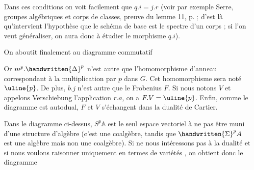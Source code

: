 
Dans ces conditions on voit facilement que $q.i=j.r$ (voir par exemple Serre, groupes algébriques et corps de classes, preuve du lemme 11, p. ; d'est là qu'intervient l'hypothèse que le schéma de base est le spectre d'un corps ; si l'on veut généraliser, on aura donc à étudier le morphisme $q.i$).

On aboutit finalement au diagramme commutatif

Or $m^p.\handwritten{\Delta}^{p}$ n'est autre que l'homomorphisme d'anneau correspondant à la multiplication par $p$ dans $G$. Cet homomorphisme sera noté $\uline{p}$. De plus, $b.j$ n'est autre que le Frobenius $F$. Si nous notons $V$ et appelons Verschiebung l'application $r.a$, on a $F.V=\uline{p}$. Enfin, comme le diagramme est autodual, $F$ et $V$ s'échangent dans la dualité de Cartier.

Dans le diagramme ci-dessus, $S^p\mathbb{A}$ est le seul espace vectoriel à ne pas être muni d'une structure d'algèbre (c'est une coalgèbre, tandis que $\handwritten{\Sigma}^{p}A$ est une algèbre mais non une coalgèbre). Si  ne nous intéressons pas à la dualité et si nous voulons raisonner uniquement en termes de variétés , on obtient donc le diagramme
